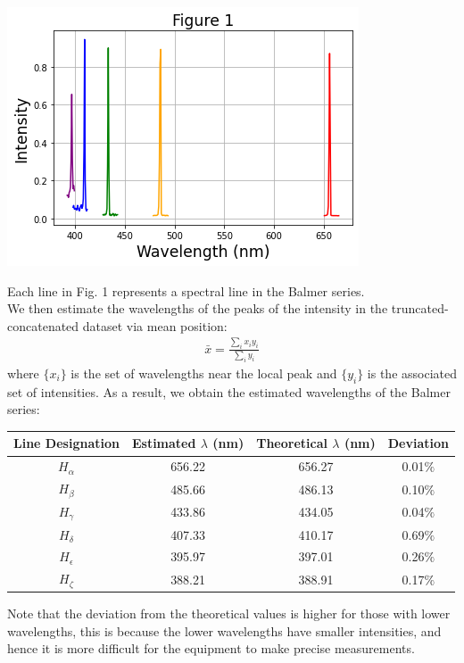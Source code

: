\documentclass[11pt]{book}
\theoremstyle{break}
\theoremstyle{break}
\begin{document}
\begin{center}
\includegraphics[scale=0.55]{fig1}
\end{center} 
Each line in Fig. 1 represents a spectral line in the Balmer series.\\

We then estimate the wavelengths of the peaks of the intensity in the truncated-concatenated dataset via mean position:
\begin{align*}
\bar{x} = \frac{\sum_i x_i y_i}{\sum_i y_i}
\end{align*} 
where $\{x_i\}$ is the set of wavelengths near the local peak and $\{y_i\}$ is the associated set of intensities. As a result, we obtain the estimated wavelengths of the Balmer series:
\begin{center}
\begin{tabular}{|c|c|c|c|}
\hline
Line Designation & Estimated $\lambda$ (nm) & Theoretical $\lambda$ (nm)& Deviation \\
\hline 
$H_\alpha$ & 656.22 & 656.27 & 0.01$\%$ \\
\hline
$H_\beta$ & 485.66 & 486.13 & 0.10$\%$\\
\hline
$H_\gamma$ & 433.86 & 434.05 & 0.04$\%$\\
\hline
$H_\delta$ & 407.33 & 410.17 & 0.69$\%$\\
\hline
$H_\epsilon$ & 395.97 & 397.01 & 0.26$\%$\\
\hline
$H_\zeta$ & 388.21 & 388.91 & 0.17$\%$\\
\hline
\end{tabular}
\end{center}
Note that the deviation from the theoretical values is higher for those with lower wavelengths, this is because the lower wavelengths have smaller intensities, and hence it is more difficult for the equipment to make precise measurements.\\
\end{document}
